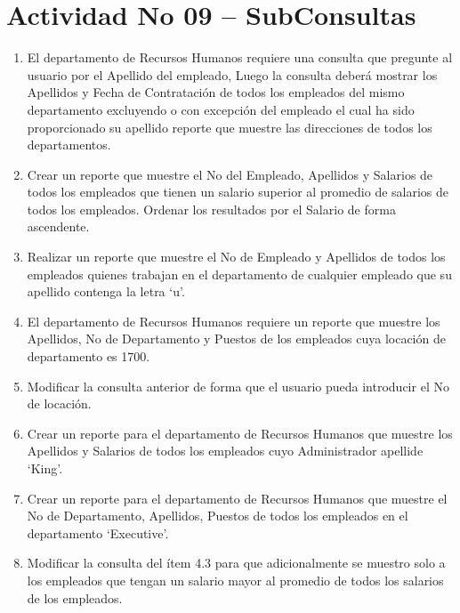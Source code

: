 \section{Actividad No 09 – SubConsultas} 
		
\begin{enumerate}[1.]
	\item El departamento de Recursos Humanos requiere una consulta que pregunte al usuario por el Apellido del empleado, Luego la consulta deber\'a mostrar los Apellidos y Fecha de Contrataci\'on de todos los empleados del mismo departamento excluyendo o con excepción del empleado el cual ha sido proporcionado su apellido reporte que muestre las direcciones de todos los departamentos.
	\item Crear un reporte que muestre el No del Empleado, Apellidos y Salarios de todos los empleados que tienen un salario superior al promedio de salarios de todos los empleados. Ordenar los resultados por el Salario de forma ascendente.
	\item Realizar un reporte que muestre el No de Empleado y Apellidos de todos los empleados quienes trabajan
en el departamento de cualquier empleado que su apellido contenga la letra ‘u’.
	\item El departamento de Recursos Humanos requiere un reporte que muestre los Apellidos, No de Departamento y Puestos de los empleados cuya locación de departamento es 1700.
	\item Modificar la consulta anterior de forma que el usuario pueda introducir el No de locaci\'on.
	\item Crear un reporte para el departamento de Recursos Humanos que muestre los Apellidos y Salarios de todos los empleados cuyo Administrador apellide ‘King’.
	\item Crear un reporte para el departamento de Recursos Humanos que muestre el No de Departamento, Apellidos, Puestos de todos los empleados en el departamento ‘Executive’.
	\item Modificar la consulta del ítem 4.3 para que adicionalmente se muestro solo a los empleados que tengan un salario mayor al promedio de todos los salarios de los empleados.
\end{enumerate}
